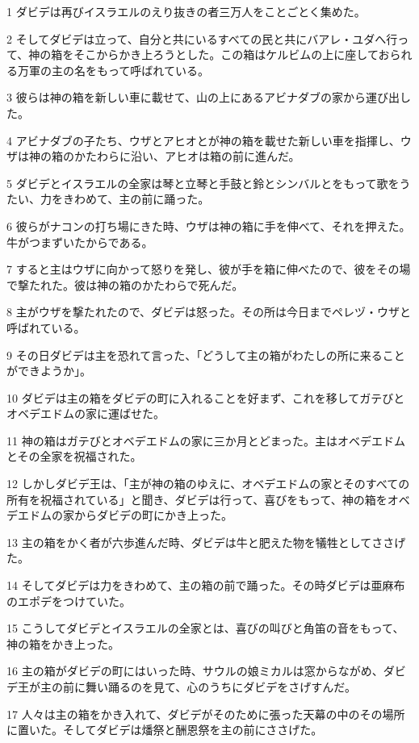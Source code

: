 \par 1 ダビデは再びイスラエルのえり抜きの者三万人をことごとく集めた。
\par 2 そしてダビデは立って、自分と共にいるすべての民と共にバアレ・ユダへ行って、神の箱をそこからかき上ろうとした。この箱はケルビムの上に座しておられる万軍の主の名をもって呼ばれている。
\par 3 彼らは神の箱を新しい車に載せて、山の上にあるアビナダブの家から運び出した。
\par 4 アビナダブの子たち、ウザとアヒオとが神の箱を載せた新しい車を指揮し、ウザは神の箱のかたわらに沿い、アヒオは箱の前に進んだ。
\par 5 ダビデとイスラエルの全家は琴と立琴と手鼓と鈴とシンバルとをもって歌をうたい、力をきわめて、主の前に踊った。
\par 6 彼らがナコンの打ち場にきた時、ウザは神の箱に手を伸べて、それを押えた。牛がつまずいたからである。
\par 7 すると主はウザに向かって怒りを発し、彼が手を箱に伸べたので、彼をその場で撃たれた。彼は神の箱のかたわらで死んだ。
\par 8 主がウザを撃たれたので、ダビデは怒った。その所は今日までペレヅ・ウザと呼ばれている。
\par 9 その日ダビデは主を恐れて言った、「どうして主の箱がわたしの所に来ることができようか」。
\par 10 ダビデは主の箱をダビデの町に入れることを好まず、これを移してガテびとオベデエドムの家に運ばせた。
\par 11 神の箱はガテびとオベデエドムの家に三か月とどまった。主はオベデエドムとその全家を祝福された。
\par 12 しかしダビデ王は、「主が神の箱のゆえに、オベデエドムの家とそのすべての所有を祝福されている」と聞き、ダビデは行って、喜びをもって、神の箱をオベデエドムの家からダビデの町にかき上った。
\par 13 主の箱をかく者が六歩進んだ時、ダビデは牛と肥えた物を犠牲としてささげた。
\par 14 そしてダビデは力をきわめて、主の箱の前で踊った。その時ダビデは亜麻布のエポデをつけていた。
\par 15 こうしてダビデとイスラエルの全家とは、喜びの叫びと角笛の音をもって、神の箱をかき上った。
\par 16 主の箱がダビデの町にはいった時、サウルの娘ミカルは窓からながめ、ダビデ王が主の前に舞い踊るのを見て、心のうちにダビデをさげすんだ。
\par 17 人々は主の箱をかき入れて、ダビデがそのために張った天幕の中のその場所に置いた。そしてダビデは燔祭と酬恩祭を主の前にささげた。
